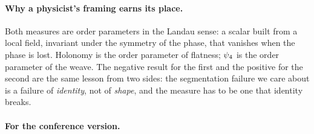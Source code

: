 \paragraph{Why a physicist's framing earns its place.} Both measures are order parameters in the Landau sense: a scalar built from a local field, invariant under the symmetry of the phase, that vanishes when the phase is lost. Holonomy is the order parameter of flatness; $\psi_4$ is the order parameter of the weave. The negative result for the first and the positive for the second are the same lesson from two sides: the segmentation failure we care about is a failure of \emph{identity}, not of \emph{shape}, and the measure has to be one that identity breaks.

\paragraph{For the conference version.} 
